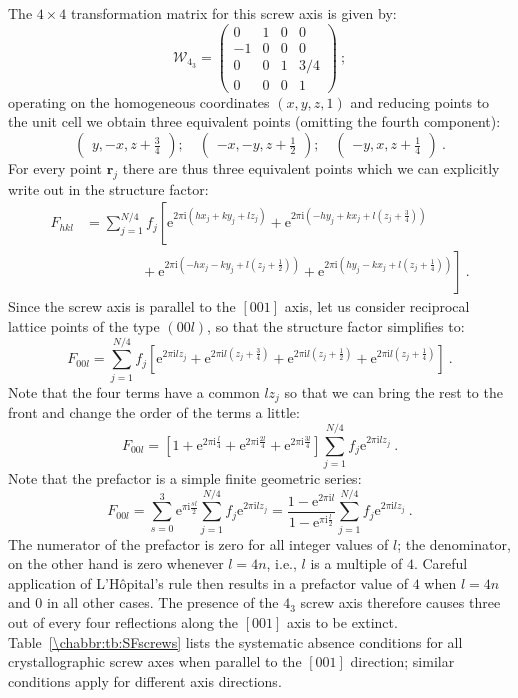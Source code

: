 The $4\times 4$ transformation matrix for this screw axis is given by:
\[
	\mathcal{W}_{4_3} = \begin{pmatrix}0&1&0&0\\ -1&0&0&0\\ 0&0&1&3/4\\0&0&0&1\end{pmatrix}\ ;
\]
operating on the homogeneous coordinates $(x,y,z,1)$ and reducing points to the unit cell we obtain three equivalent points (omitting the fourth component):
\[
	\begin{pmatrix}y,-x,z+\frac{3}{4}\end{pmatrix};\quad	\begin{pmatrix}-x,-y,z+\frac{1}{2}\end{pmatrix};\quad	\begin{pmatrix}-y,x,z+\frac{1}{4}\end{pmatrix}\ .
\]
For every point $\mathbf{r}_j$ there are thus three equivalent points which we can explicitly write out in the structure factor:
\begin{equation*}
\begin{split}
	F_{hkl} &= \sum_{j=1}^{N/4}f_j\left[\mathrm{e}^{2\pi\mathrm{i}(hx_j+ky_j+lz_j)} + \mathrm{e}^{2\pi\mathrm{i}(-hy_j+kx_j+l(z_j+\frac{3}{4}))}\right.\\
	             &\qquad\qquad+ \left. \mathrm{e}^{2\pi\mathrm{i}(-hx_j-ky_j+l(z_j+\frac{1}{2}))}+ \mathrm{e}^{2\pi\mathrm{i}(hy_j-kx_j+l(z_j+\frac{1}{4}))}\right]\ .
\end{split}
\end{equation*}
Since the screw axis is parallel to the $[001]$ axis, let us consider reciprocal lattice points of the type $(00l)$, so that the structure factor simplifies to:
\[
		F_{00l} = \sum_{j=1}^{N/4}f_j\left[\mathrm{e}^{2\pi\mathrm{i} lz_j } + \mathrm{e}^{2\pi\mathrm{i}l(z_j+\frac{3}{4})}
		+  \mathrm{e}^{2\pi\mathrm{i}l(z_j+\frac{1}{2})}+ \mathrm{e}^{2\pi\mathrm{i}l(z_j+\frac{1}{4})}\right]\ .
\]
Note that the four terms have a common $lz_j$ so that we can bring the rest to the front and change the order of the terms a little:
\[
	F_{00l} = \left[1 +  \mathrm{e}^{2\pi\mathrm{i}\frac{l}{4}}+  \mathrm{e}^{2\pi\mathrm{i}\frac{2l}{4}}+  \mathrm{e}^{2\pi\mathrm{i}\frac{3l}{4}} \right]  \sum_{j=1}^{N/4}f_j \mathrm{e}^{2\pi\mathrm{i} lz_j }\ .
\]
Note that the prefactor is a simple finite geometric series:
\[
	F_{00l} = \sum_{s=0}^{3}\mathrm{e}^{\pi\mathrm{i} \frac{sl}{2}}  \sum_{j=1}^{N/4}f_j \mathrm{e}^{2\pi\mathrm{i} lz_j } = \frac{1-\mathrm{e}^{2\pi\mathrm{i}l}}{1-
\mathrm{e}^{\pi \mathrm{i}\frac{l}{2}}} \sum_{j=1}^{N/4}f_j \mathrm{e}^{2\pi\mathrm{i} lz_j }\ .
\]
The numerator of the prefactor is zero for all integer values of $l$; the denominator, on the other hand is zero whenever $l=4n$, i.e., $l$ is a multiple of $4$.  Careful application of L'H{\^o}pital's rule then results in a prefactor value of $4$ when $l=4n$ and $0$ in all other cases.  The presence of the $4_3$ screw axis therefore causes three out of every four reflections along the $[001]$ axis to be extinct.  Table~\ref{\chabbr:tb:SFscrews} lists the systematic absence conditions for all crystallographic screw axes when parallel to the $[001]$ direction; similar conditions apply for different axis directions.

